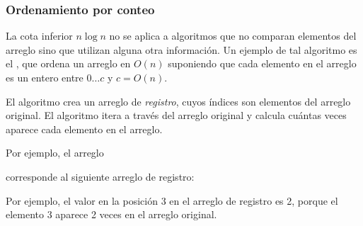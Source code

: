 \subsubsection{Ordenamiento por conteo}


La cota inferior $n \log n$ no se aplica a
algoritmos que no comparan elementos del arreglo
sino que utilizan alguna otra información.
Un ejemplo de tal algoritmo es el
, que ordena un arreglo en
$O(n)$ suponiendo que cada elemento en el arreglo
es un entero entre $0 \ldots c$ y $c=O(n)$.

El algoritmo crea un arreglo de \emph{registro},
cuyos índices son elementos del arreglo original.
El algoritmo itera a través del arreglo original
y calcula cuántas veces aparece cada elemento
en el arreglo.

Por ejemplo, el arreglo
\begin{center}
\end{center}
corresponde al siguiente arreglo de registro:
\begin{center}
\end{center}

Por ejemplo, el valor en la posición 3
en el arreglo de registro es 2,
porque el elemento 3 aparece 2 veces
en el arreglo original.

